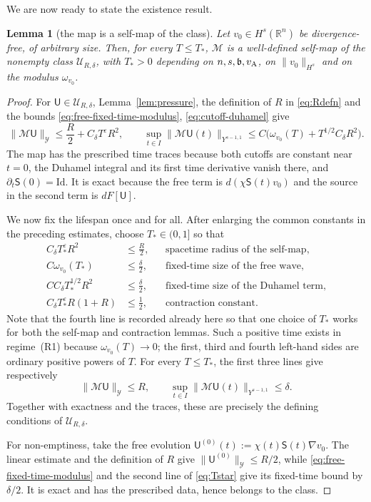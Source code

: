 \documentclass[11pt,reqno]{amsart}
\theoremstyle{plain}
\newtheorem{lemma}[theorem]{Lemma}
\theoremstyle{definition}
\theoremstyle{remark}
\numberwithin{equation}{section}
\newcommand{\breg}{\mathfrak b}
\newcommand{\Ufield}{\mathsf U}
\newcommand{\Sprop}{\mathsf S}
\newcommand{\Real}{\mathbb R}
\newcommand{\Rn}{\Real^n}
\begin{document}
We are now ready to state the existence result.
\begin{lemma}[the map is a self-map of the class]\label{lem:selfmap}
Let $v_0\in H^{s}(\Rn)$ be divergence-free,
of arbitrary size. Then, for every $T\le T_*$, $\mathcal M$ is a well-defined self-map of the
nonempty class $\mathcal U_{R,\delta}$, with $T_*>0$ depending on
$n,s,\breg,v_{\rm A}$, on $\|v_0\|_{H^{s}}$ and on the modulus $\omega_{v_0}$.
\end{lemma}

\begin{proof}
For $\Ufield\in\mathcal U_{R,\delta}$, Lemma~\ref{lem:pressure}, the definition of $R$ in \eqref{eq:Rdefn} and the bounds \eqref{eq:free-fixed-time-modulus},
\eqref{eq:cutoff-duhamel} give
\[
 \|\mathcal M\Ufield\|_{\mathcal Y}
 \le \frac R2+C_\delta T^\varepsilon R^2,
 \qquad
 \sup_{t\in I}\|\mathcal M\Ufield(t)\|_{Y^{s-1,1}}
 \le C\big(\omega_{v_0}(T)+T^{1/2}C_\delta R^2\big).
\]
The map has the prescribed time traces because both cutoffs are constant near
$t=0$, the Duhamel integral and its first time derivative vanish there, and
$\partial_t\Sprop(0)=\mathrm{Id}$.  It is exact because the free term is
$d(\chi\Sprop(t)v_0)$ and the source in the second term is $dF[\Ufield]$.

We now fix the lifespan once and for all. After enlarging the common constants in the preceding estimates, choose
$T_*\in(0,1]$ so that
\begin{equation}\label{eq:Tstar}
\begin{aligned}
 C_\delta T_*^\varepsilon R^2&\le\tfrac R2,
 &&\text{spacetime radius of the self-map},\\
 C\omega_{v_0}(T_*)&\le\tfrac\delta2,
 &&\text{fixed-time size of the free wave},\\
 CC_\delta T_*^{1/2}R^2&\le\tfrac\delta2,
 &&\text{fixed-time size of the Duhamel term},\\
 C_\delta T_*^\varepsilon R(1+R)&\le\tfrac12,
 &&\text{contraction constant}.
\end{aligned}
\end{equation}
Note that the fourth line is recorded already here so that one choice of $T_*$ works for
both the self-map and contraction lemmas.  Such a positive time exists in
regime~\textup{(R1)} because $\omega_{v_0}(T)\to0$; the first, third and fourth
left-hand sides are ordinary positive powers of $T$.  For every $T\le T_*$,
the first three lines give respectively
\[
 \|\mathcal M\Ufield\|_{\mathcal Y}\le R,
 \qquad
 \sup_{t\in I}\|\mathcal M\Ufield(t)\|_{Y^{s-1,1}}\le\delta.
\]
Together with exactness and the traces, these are precisely the defining
conditions of $\mathcal U_{R,\delta}$.

For non-emptiness, take the free evolution
$\Ufield^{(0)}(t):=\chi(t)\Sprop(t)\nabla v_0$.  The linear estimate and the
definition of $R$ give
$\|\Ufield^{(0)}\|_{\mathcal Y}\le R/2$, while
\eqref{eq:free-fixed-time-modulus} and the second line of
\eqref{eq:Tstar} give its fixed-time bound by $\delta/2$.  It is exact and has
the prescribed data, hence belongs to the class.
\end{proof}
\end{document}
